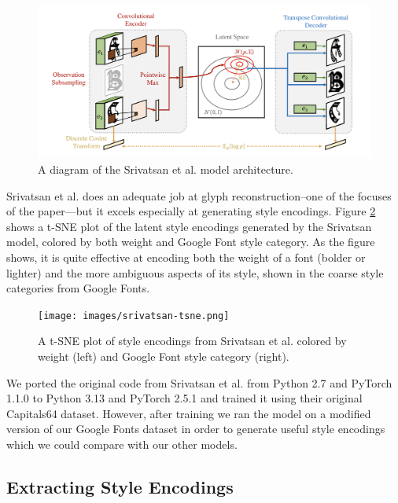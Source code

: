 \begin{figure}[h]
    \centering
    \includegraphics[width=\textwidth]{images/srivatsan-model.png}
    \caption{A diagram of the Srivatsan et al. model architecture.}
    \label{fig:srivatsan-model}
\end{figure}
 
Srivatsan et al. does an adequate job at glyph reconstruction–one of the focuses of the paper—but it excels especially at generating style encodings. Figure \ref{fig:srivatsan-tsne} shows a t-SNE plot of the latent style encodings generated by the Srivatsan model, colored by both weight and Google Font style category. As the figure shows, it is quite effective at encoding both the weight of a font (bolder or lighter) and the more ambiguous aspects of its style, shown in the coarse style categories from Google Fonts.

\begin{figure}[h]
    \centering
    \texttt{[image: images/srivatsan-tsne.png]}
    \caption{A t-SNE plot of style encodings from Srivatsan et al. colored by weight (left) and Google Font style category (right).}
    \label{fig:srivatsan-tsne}
\end{figure}

We ported the original code from Srivatsan et al. from Python 2.7 and PyTorch 1.1.0 to Python 3.13 and PyTorch 2.5.1 and trained it using their original Capitals64 dataset. However, after training we ran the model on a modified version of our Google Fonts dataset in order to generate useful style encodings which we could compare with our other models.

\subsection{Extracting Style Encodings}


